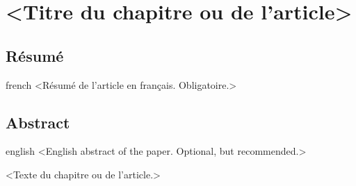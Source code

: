 \chapter{<Titre du chapitre ou de l'article>}     %
\label{chap-}                   %

\section{Résumé}

\begin{otherlanguage*}{french}
  <Résumé de l'article en français. Obligatoire.>
\end{otherlanguage*}

\section{Abstract}

\begin{otherlanguage*}{english}
  <English abstract of the paper. Optional, but recommended.>
\end{otherlanguage*}

<Texte du chapitre ou de l'article.>

